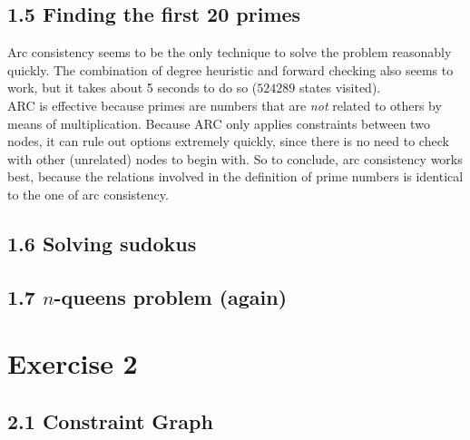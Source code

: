 \documentclass{article}
\begin{document}
\subsection*{1.5 \hspace*{0.3cm} Finding the first 20 primes}
Arc consistency seems to be the only technique to solve the problem reasonably quickly. The combination of degree heuristic and forward checking also seems to work, but it takes about 5 seconds to do so ($524289$ states visited). \\
ARC is effective because primes are numbers that are \textit{not} related to others by means of multiplication. Because ARC only applies constraints between two nodes, it can rule out options extremely quickly, since there is no need to check with other (unrelated) nodes to begin with. So to conclude, arc consistency works best, because the relations involved in the definition of prime numbers is identical to the one of arc consistency.
\subsection*{1.6 \hspace*{0.3cm} Solving sudokus}
\subsection*{1.7 \hspace*{0.3cm} $n$-queens problem (again)}

\section*{Exercise 2}
\subsection*{2.1 \hspace*{0.3cm} Constraint Graph}
\end{document}
